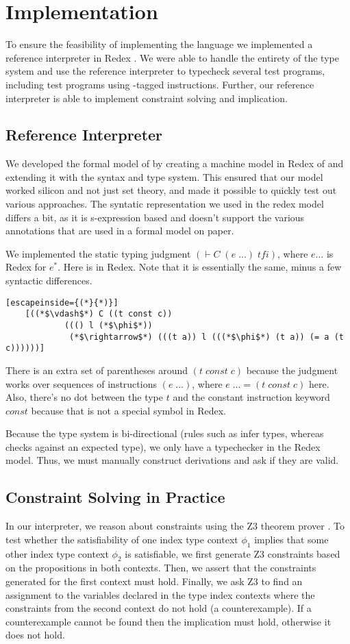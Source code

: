 \chapter{Implementation}
To ensure the feasibility of implementing the \name language we implemented a reference interpreter in Redex \cite{redex}.
We were able to handle the entirety of the type system and use the reference interpreter to typecheck several test programs, including test programs using \prechk-tagged instructions.
Further, our reference interpreter is able to implement constraint solving and implication.

\section{Reference Interpreter}
We developed the formal model of \name by creating a machine model in Redex of \wasm and extending it with the \name syntax and type system.
This ensured that our model worked silicon and not just set theory, and made it possible to quickly test out various approaches.
The syntatic representation we used in the redex model differs a bit, as it is s-expression based and doesn't support the various annotations that are used in a formal model on paper.

We implemented the static typing judgment $(\vdash C\; (e\;...)\; tfi)$, where $e ...$ is Redex for $e^{*}$.
Here is  in Redex.
Note that it is essentially the same, minus a few syntactic differences.
\begin{lstlisting}[escapeinside={(*}{*)}]
    [((*$\vdash$*) C ((t const c))
            ((() l (*$\phi$*))
             (*$\rightarrow$*) (((t a)) l (((*$\phi$*) (t a)) (= a (t c))))))]
\end{lstlisting}
There is an extra set of parentheses around $(t\;const\;c)$ because the judgment works over sequences of instructions $(e\;...)$, where $e\;... = (t\;const\;c)$ here.
Also, there's no dot between the type $t$ and the constant instruction keyword $const$ because that is not a special symbol in Redex.

Because the \name type system is bi-directional (rules such as  infer types, whereas  checks against an expected type), we only have a typechecker in the Redex model.
Thus, we must manually construct derivations and ask if they are valid.

\section{Constraint Solving in Practice}
In our interpreter, we reason about constraints using the Z3 theorem prover \cite{z3}.
To test whether the satisfiability of one index type context $\phi_1$ implies that some other index type context $\phi_2$ is satisfiable, we first generate Z3 constraints based on the propositions in both contexts.
Then, we assert that the constraints generated for the first context must hold.
Finally, we ask Z3 to find an assignment to the variables declared in the type index contexts where the constraints from the second context do not hold (a counterexample).
If a counterexample cannot be found then the implication must hold, otherwise it does not hold.

